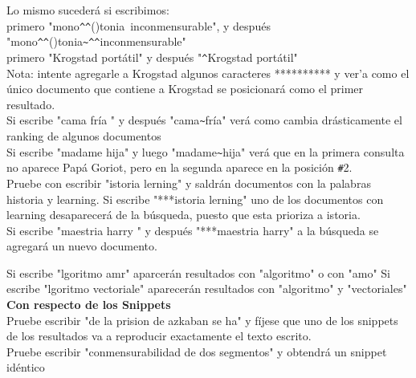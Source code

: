 \documentclass[12pt]{article}
\begin{document}
   Lo mismo suceder\'a si escribimos:  \\
    primero "mono\verb|^^|()tonia~inconmensurable", y despu\'es "mono\verb|^^|()tonia\verb|~^^|inconmensurable"  \\
    primero "Krogstad port\'atil" y despu\'es "\verb|^|Krogstad port\'atil"  \\
   Nota: intente agregarle a Krogstad algunos caracteres ********** y ver'a como el \'unico documento que contiene a Krogstad se posicionar\'a como el primer resultado.\\
   
   Si escribe "cama fr\'ia " y despu\'es "cama\verb|~|fr\'ia" ver\'a como cambia dr\'asticamente el ranking de algunos documentos\\ 
   Si escribe "madame hija" y luego "madame\verb|~|hija" ver\'a que en la primera consulta no aparece Pap\'a Goriot, pero en la segunda aparece en la posici\'on \verb|#|2.  \\
   
   Pruebe con escribir "istoria lerning" y saldr\'an documentos con la palabras historia y learning. Si escribe "***istoria lerning" uno de los documentos con learning desaparecer\'a de la b\'usqueda, puesto que esta prioriza a istoria. \\
   
    Si escribe "maestria harry "  y despu\'es  "***maestria harry" a la b\'usqueda se agregar\'a un nuevo documento.   
    
    Si escribe "lgoritmo amr" aparcer\'an resultados con "algoritmo" o con "amo"
    Si escribe "lgoritmo vectoriale" aparecer\'an resultados con "algoritmo" y "vectoriales"\\
      
   \textbf{ Con respecto de los Snippets} \\
   Pruebe escribir "de la prision de azkaban se ha" y f\'ijese que uno de los snippets de los resultados va a reproducir exactamente el texto escrito.\\
   Pruebe escribir "conmensurabilidad de dos segmentos" y obtendr\'a un snippet id\'entico
   

   




















    
   
   
\end{document}

